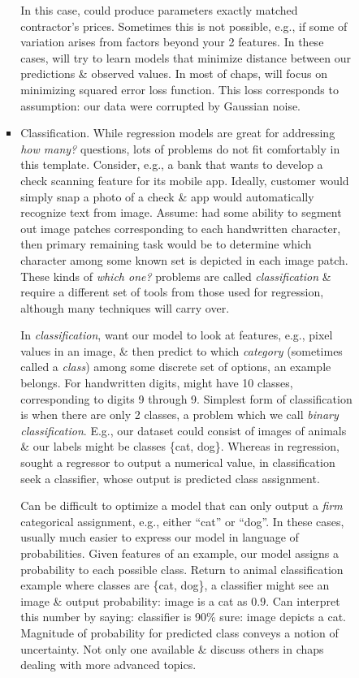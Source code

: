 \documentclass{article}
\begin{document}
\begin{itemize}
\begin{itemize}
\begin{itemize}
\begin{itemize}
				In this case, could produce parameters exactly matched contractor's prices. Sometimes this is not possible, e.g., if some of variation arises from factors beyond your 2 features. In these cases, will try to learn models that minimize distance between our predictions \& observed values. In most of chaps, will focus on minimizing squared error loss function. This loss corresponds to assumption: our data were corrupted by Gaussian noise.
				\item {\sf Classification.} While regression models are great for addressing {\it how many?} questions, lots of problems do not fit comfortably in this template. Consider, e.g., a bank that wants to develop a check scanning feature for its mobile app. Ideally, customer would simply snap a photo of a check \& app would automatically recognize text from image. Assume: had some ability to segment out image patches corresponding to each handwritten character, then primary remaining task would be to determine which character among some known set is depicted in each image patch. These kinds of {\it which one?} problems are called {\it classification} \& require a different set of tools from those used for regression, although many techniques will carry over.

				In {\it classification}, want our model to look at features, e.g., pixel values in an image, \& then predict to which {\it category} (sometimes called a {\it class}) among some discrete set of options, an example belongs. For handwritten digits, might have 10 classes, corresponding to digits 9 through 9. Simplest form of classification is when there are only 2 classes, a problem which we call {\it binary classification}. E.g., our dataset could consist of images of animals \& our labels might be classes \{cat, dog\}. Whereas in regression, sought a regressor to output a numerical value, in classification seek a classifier, whose output is predicted class assignment.

				Can be difficult to optimize a model that can only output a {\it firm} categorical assignment, e.g., either ``cat'' or ``dog''. In these cases, usually much easier to express our model in language of probabilities. Given features of an example, our model assigns a probability to each possible class. Return to animal classification example where classes are \{cat, dog\}, a classifier might see an image \& output probability: image is a cat as $0.9$. Can interpret this number by saying: classifier is 90\% sure: image depicts a cat. Magnitude of probability for predicted class conveys a notion of uncertainty. Not only one available \& discuss others in chaps dealing with more advanced topics.


\end{itemize}
\end{itemize}
\end{itemize}
\end{itemize}
\end{document}
